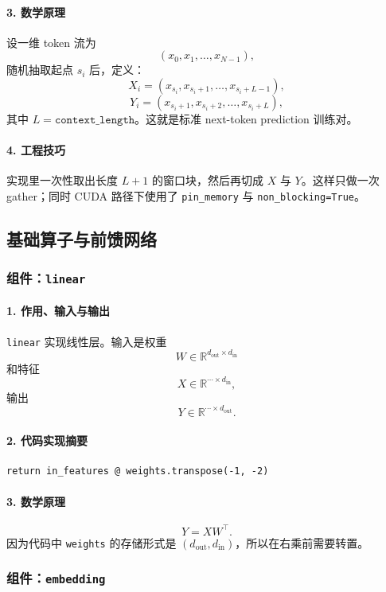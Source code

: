 \documentclass[UTF8,a4paper,11pt]{ctexart}
\begin{document}
\paragraph{3. 数学原理}
设一维 token 流为
\[
(x_0, x_1, \dots, x_{N-1}),
\]
随机抽取起点 \(s_i\) 后，定义：
\[
X_i = (x_{s_i}, x_{s_i+1}, \dots, x_{s_i+L-1}),
\]
\[
Y_i = (x_{s_i+1}, x_{s_i+2}, \dots, x_{s_i+L}),
\]
其中 \(L = \texttt{context\_length}\)。这就是标准 next-token prediction 训练对。

\paragraph{4. 工程技巧}
实现里一次性取出长度 \(L+1\) 的窗口块，然后再切成 \(X\) 与 \(Y\)。这样只做一次 gather；同时 CUDA 路径下使用了 \texttt{pin\_memory} 与 \texttt{non\_blocking=True}。

\subsection{基础算子与前馈网络}

\subsubsection{组件：\texttt{linear}}
\paragraph{1. 作用、输入与输出}
\texttt{linear} 实现线性层。输入是权重
\[
W \in \mathbb{R}^{d_{\text{out}} \times d_{\text{in}}}
\]
和特征
\[
X \in \mathbb{R}^{\cdots \times d_{\text{in}}},
\]
输出
\[
Y \in \mathbb{R}^{\cdots \times d_{\text{out}}}.
\]

\paragraph{2. 代码实现摘要}
\begin{lstlisting}
return in_features @ weights.transpose(-1, -2)
\end{lstlisting}

\paragraph{3. 数学原理}
\[
Y = X W^\top.
\]
因为代码中 \texttt{weights} 的存储形式是 \((d_{\text{out}}, d_{\text{in}})\)，所以在右乘前需要转置。

\subsubsection{组件：\texttt{embedding}}
\end{document}
